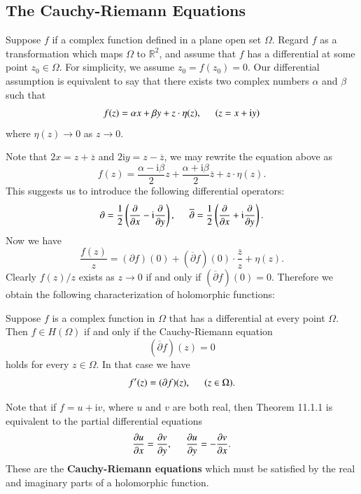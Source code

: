 \subsection{The Cauchy-Riemann Equations}
Suppose $f$ if a complex function defined in a plane open set $\Omega$. Regard $f$ as a transformation which maps $\Omega$ to $\mathbb{R}^2$, and assume that $f$ has a differential at some point $z_0\in\Omega$. For simplicity, we assume $z_0=f(z_0)=0$. Our differential assumption is equivalent to say that there exists two complex numbers $\alpha$ and $\beta$ such that 
$$f(z)=\alpha x+\beta y+z\cdot\eta(z),\hspace{0.5cm}(z=x+\mathrm{i}y)$$
where $\eta(z)\to 0$ as $z\to 0$.\par
Note that $2x=z+\overline{z}$ and $2\mathrm{i}y=z-\overline{z}$, we may rewrite the equation above as 
$$
f\left( z \right) =\frac{\alpha -\mathrm{i}\beta}{2}z+\frac{\alpha +\mathrm{i}\beta}{2}\overline{z}+z\cdot \eta \left( z \right) .
$$
This suggests us to introduce the following differential operators: 
$$
\partial =\frac{1}{2}\left( \frac{\partial}{\partial x}-\mathrm{i}\frac{\partial}{\partial y} \right) ,\hspace{0.5cm}\overline{\partial }=\frac{1}{2}\left( \frac{\partial}{\partial x}+\mathrm{i}\frac{\partial}{\partial y} \right) .
$$
Now we have 
$$
\frac{f\left( z \right)}{z}=\left( \partial f \right) \left( 0 \right) +\left( \overline{\partial }f \right) \left( 0 \right) \cdot \frac{\overline{z}}{z}+\eta \left( z \right) .
$$
Clearly $f(z)/z$ exists as $z\to 0$ if and only if $(\overline{\partial}f)(0)=0$. Therefore we obtain the following characterization of holomorphic functions: 
\begin{theorem}
Suppose $f$ is a complex function in $\Omega$ that has a differential at every point $\Omega$. Then $f\in H(\Omega)$ if and only if the Cauchy-Riemann equation 
$$(\overline{\partial}f)(z)=0$$
holds for every $z\in\Omega$. In that case we have 
$$f^\prime(z)=(\partial f)(z),\hspace{0.5cm}(z\in\Omega).$$
\end{theorem}
Note that if $f=u+\mathrm{i}v$, where $u$ and $v$ are both real, then Theorem 11.1.1 is equivalent to the partial differential equations 
$$
\frac{\partial u}{\partial x}=\frac{\partial v}{\partial y},\hspace{0.5cm}\frac{\partial u}{\partial y}=-\frac{\partial v}{\partial x}.
$$
These are the \textbf{Cauchy-Riemann equations} which must be satisfied by the real and imaginary parts of a holomorphic function.\par

